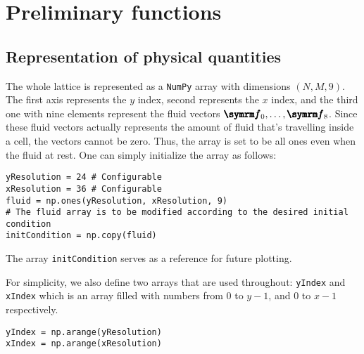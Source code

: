 \section{Preliminary functions}

\subsection{Representation of physical quantities}

The whole lattice is represented as a \texttt{NumPy} array with dimensions $(N, M, 9)$. The first axis represents the $y$ index, second represents the $x$ index, and the third one with nine elements represent the fluid vectors $\vv{f}_0, \dots, \vv{f}_8$. Since these fluid vectors actually represents the amount of fluid that's travelling inside a cell, the vectors cannot be zero. Thus, the array is set to be all ones even when the fluid at rest. One can simply initialize the array as follows:
\begin{verbatim}
yResolution = 24 # Configurable
xResolution = 36 # Configurable
fluid = np.ones(yResolution, xResolution, 9)
# The fluid array is to be modified according to the desired initial condition
initCondition = np.copy(fluid)
\end{verbatim}
The array \texttt{initCondition} serves as a reference for future plotting.

For simplicity, we also define two arrays that are used throughout: \texttt{yIndex} and \texttt{xIndex} which is an array filled with numbers from $0$ to $y - 1$, and $0$ to $x - 1$ respectively.
\begin{verbatim}
yIndex = np.arange(yResolution)
xIndex = np.arange(xResolution)
\end{verbatim}

